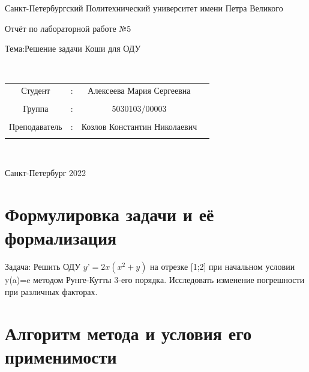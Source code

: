 \documentclass[a4paper]{article}
\begin{document}
\begin{center} 
\hfill \break 
\large{Санкт-Петербургский Политехнический университет имени Петра Великого}\\ 
 
 \hfill \break 
\hfill\break 
\hfill \break 
\hfill \break 
\hfill \break 
\begin{center}\large{Отчёт по лабораторной работе №5} \end{center}  
\hfill \break 
\large{Тема:Решение задачи Коши для ОДУ} 
\hfill \break 
\hfill \break 
 
\hfill \break 
\hfill \break 
\\ 
\hfill \break 
\hfill \break 
\end{center} 


\normalsize{ 
\begin{tabular}{cccc} 
Студент & : & Алексеева Мария Сергеевна\\\\ 
Группа & : & 5030103/00003 \\\\ 
Преподаватель & : & Козлов Константин Николаевич \\\\ 
\end{tabular} 
}\\ 
\hfill \break 
\hfill \break 
\hfill \break 
\begin{center} Санкт-Петербург 2022 \end{center} 
\thispagestyle{empty} %
 
\newpage 
	
\section{Формулировка задачи и её формализация} 
Задача: Решить ОДУ $y’=2x(x^2+y)$ на отрезке [1;2] при начальном условии y(a)=e методом Рунге-Кутты 3-его порядка. Исследовать изменение погрешности при различных факторах.
\section{Алгоритм метода и условия его применимости} 
\end{document}
